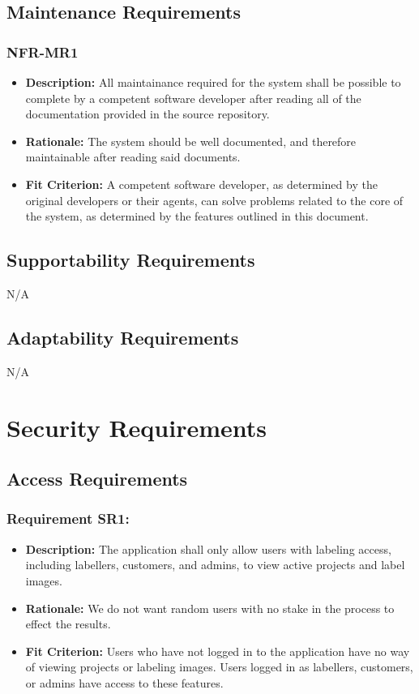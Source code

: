 \documentclass[12pt]{article}
\begin{document}
\subsection{Maintenance Requirements}
\subsubsection*{NFR-MR1}
\begin{itemize}
  \item \textbf{Description:} All maintainance required for the system shall be possible to complete by a competent software developer after reading all of the documentation provided in the source repository.
  \item \textbf{Rationale:} The system should be well documented, and therefore maintainable after reading said documents.
  \item \textbf{Fit Criterion:} A competent software developer, as determined by the original developers or their agents, can solve problems related to the core of the system, as determined by the 
  features outlined in this document.
\end{itemize}
\subsection{Supportability Requirements}
N/A
\subsection{Adaptability Requirements}
N/A

\section{Security Requirements}
\subsection{Access Requirements}
\subsubsection*{Requirement SR1:}
\begin{itemize}
  \item \textbf{Description:} The application shall only allow users with labeling access, including labellers, customers, and admins, to view active projects and label images.
  \item \textbf{Rationale:} We do not want random users with no stake in the process to effect the results.
  \item \textbf{Fit Criterion:} Users who have not logged in to the application have no way of viewing projects or labeling images. Users logged in as labellers, customers, or admins have access to these features.
\end{itemize}
\end{document}
